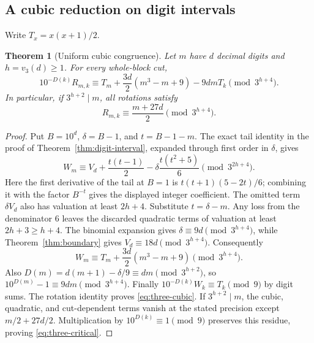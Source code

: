 \documentclass[10pt]{article}
\newtheorem{theorem}{Theorem}
\begin{document}
\subsection*{A cubic reduction on digit intervals}
Write $T_x=x(x+1)/2$.
\begin{theorem}[Uniform cubic congruence]\label{thm:three-cubic}
Let $m$ have $d$ decimal digits and $h=v_3(d)\ge1$.
For every whole-block cut,
\begin{equation}\label{eq:three-cubic}
 10^{-D(k)}R_{m,k}\equiv
 T_m+\frac{3d}{2}(m^3-m+9)-9dmT_k\pmod{3^{h+4}}.
\end{equation}
In particular, if $3^{h+2}\mid m$, all rotations satisfy
\begin{equation}\label{eq:three-critical}
 R_{m,k}\equiv\frac{m+27d}{2}\pmod{3^{h+4}}.
\end{equation}
\end{theorem}
\begin{proof}
Put $B=10^d$, $\delta=B-1$, and $t=B-1-m$.
The exact tail identity in the proof of Theorem~\ref{thm:digit-interval},
expanded through first order in $\delta$, gives
\[
 W_m\equiv V_d+\frac{t(t-1)}2
       -\delta\frac{t(t^2+5)}6\pmod{3^{2h+4}}.
\]
Here the first derivative of the tail at $B=1$ is
$t(t+1)(5-2t)/6$; combining it with the factor $B^{-t}$ gives the displayed
integer coefficient. The omitted term $\delta V_d$ also has valuation at
least $2h+4$.
Substitute $t=\delta-m$. Any loss from the denominator 6 leaves the
discarded quadratic terms of valuation at least $2h+3\ge h+4$.
The binomial expansion gives $\delta\equiv9d\pmod{3^{h+4}}$, while
Theorem~\ref{thm:boundary} gives $V_d\equiv18d\pmod{3^{h+4}}$.
Consequently
\[
 W_m\equiv T_m+\frac{3d}{2}(m^3-m+9)\pmod{3^{h+4}}.
\]
Also $D(m)=d(m+1)-\delta/9\equiv dm\pmod{3^{h+2}}$,
so $10^{D(m)}-1\equiv9dm\pmod{3^{h+4}}$.
Finally $10^{-D(k)}W_k\equiv T_k\pmod9$ by digit sums.
The rotation identity proves \eqref{eq:three-cubic}.
If $3^{h+2}\mid m$, the cubic, quadratic, and cut-dependent terms vanish
at the stated precision except $m/2+27d/2$.
Multiplication by $10^{D(k)}\equiv1\pmod9$ preserves this residue,
proving \eqref{eq:three-critical}.
\end{proof}
\end{document}
